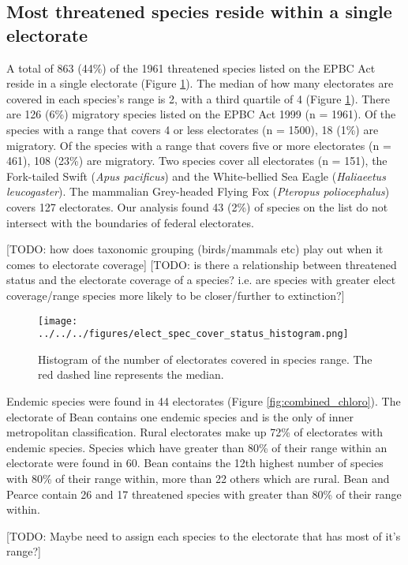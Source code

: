 \documentclass[a4paper,11pt]{article}
\begin{document}
\subsection{Most threatened species reside within a single electorate}

A total of 863 (44\%) of the 1961 threatened species listed on the EPBC Act reside in a single electorate (Figure \ref{fig:hist}). The median of how many electorates are covered in each species's range is 2, with a third quartile of 4 (Figure \ref{fig:hist}). There are 126 (6\%) migratory species listed on the EPBC Act 1999 (n = 1961). Of the species with a range that covers 4 or less electorates (n = 1500), 18 (1\%) are migratory. Of the species with a range that covers five or more electorates (n = 461), 108 (23\%) are migratory. Two species cover all electorates (n = 151), the Fork-tailed Swift (\emph{Apus pacificus}) and the White-bellied Sea Eagle (\emph{Haliaeetus leucogaster}). The mammalian Grey-headed Flying Fox (\emph{Pteropus poliocephalus}) covers 127 electorates. Our analysis found 43 (2\%) of species on the list do not intersect with the boundaries of federal electorates.

[TODO: how does taxonomic grouping (birds/mammals etc) play out when it comes to electorate coverage]
[TODO: is there a relationship between threatened status and the electorate coverage of a species? i.e. are species with greater elect coverage/range species more likely to be closer/further to extinction?]

\begin{figure}[H]
	\centering
    \texttt{[image: ../../../figures/elect\_spec\_cover\_status\_histogram.png]}
    \caption{Histogram of the number of electorates covered in species range. The red dashed line represents the median.}
    \label{fig:hist}
\end{figure}

Endemic species were found in 44 electorates (Figure \ref{fig:combined_chloro}). The electorate of Bean contains one endemic species and is the only of inner metropolitan classification. Rural electorates make up 72\% of electorates with endemic species. Species which have greater than 80\% of their range within an electorate were found in 60. Bean contains the 12th highest number of species with 80\% of their range within, more than 22 others which are rural. Bean and Pearce contain 26 and 17 threatened species with greater than 80\% of their range within.

[TODO: Maybe need to assign each species to the electorate that has most of it's range?]
\end{document}
